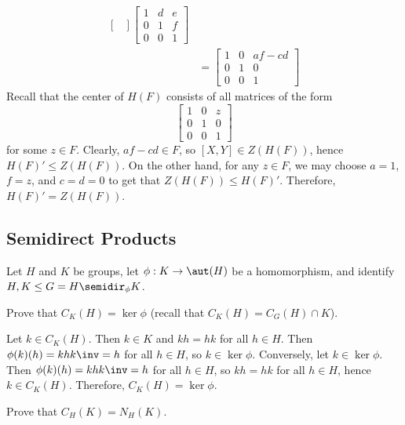 \begin{sol}
\begin{align*}
\begin{bmatrix}
        \end{bmatrix}
        \begin{bmatrix}
            1 & d & e \\
            0 & 1 & f \\
            0 & 0 & 1
        \end{bmatrix} \\
        & =
        \begin{bmatrix}
            1 & 0 & af - cd \\
            0 & 1 & 0 \\
            0 & 0 & 1
        \end{bmatrix}
    \end{align*}
    Recall that the center of $H(F)$ consists of all matrices of the form
    \[
    \begin{bmatrix}
        1 & 0 & z \\
        0 & 1 & 0 \\
        0 & 0 & 1
    \end{bmatrix}\]
    for some $z \in F$. Clearly, $af - cd \in F$, so $[X, Y] \in Z(H(F))$, hence $H(F)' \leq Z(H(F))$. On the other hand, for any $z \in F$, we may choose $a = 1$, $f = z$, and $c = d = 0$ to get that $Z(H(F)) \leq H(F)'$. Therefore, $H(F)' = Z(H(F))$.
\end{sol}

\newpage

\subsection{Semidirect Products}

Let $H$ and $K$ be groups, let $\phi : K \to \aut(H)$ be a homomorphism, and identify $H, K \leq G = H \semidir_\phi K$.

\begin{exercise}\label{ex5.5.1}
    Prove that $C_K(H) = \ker\phi$ (recall that $C_K(H) = C_G(H) \cap K$).
\end{exercise}

\begin{sol}
    Let $k \in C_K(H)$. Then $k \in K$ and $kh = hk$ for all $h \in H$. Then $\phi(k)(h) = khk\inv = h$ for all $h \in H$, so $k \in \ker\phi$. Conversely, let $k \in \ker\phi$. Then $\phi(k)(h) = khk\inv = h$ for all $h \in H$, so $kh = hk$ for all $h \in H$, hence $k \in C_K(H)$. Therefore, $C_K(H) = \ker\phi$.
\end{sol}

\begin{exercise}\label{ex5.5.2}
    Prove that $C_H(K) = N_H(K)$.
\end{exercise}

